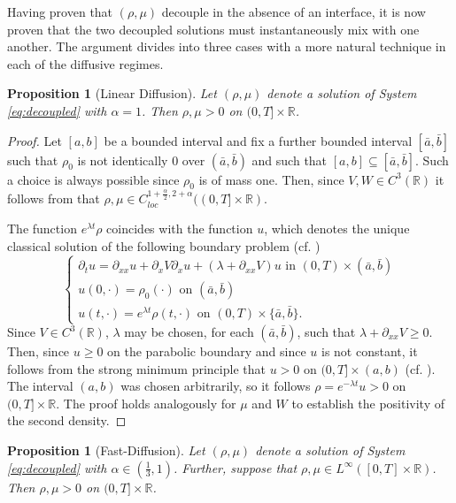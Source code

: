 \documentclass[a4paper,twosided, 11pt]{article}
\newcommand{\R}{\mathbb{R}}
\theoremstyle{plain}
\newtheorem{proposition}[thm]{Proposition}
\theoremstyle{remark}
\numberwithin{equation}{section}
\begin{document}
Having proven that $(\rho,\mu)$ decouple in the absence of an interface, it is now proven that the two decoupled solutions must instantaneously mix with one another. 
The argument divides into three cases with a more natural technique in each of the diffusive regimes.
\begin{proposition}[Linear Diffusion]\label{propn:linear}
    Let $(\rho,\mu)$ denote a solution of System \eqref{eq:decoupled} with $\alpha =1$. 
    Then $\rho,\mu > 0$ on $(0,T]\times \R$.
\end{proposition}
\begin{proof}
    Let $[a,b]$ be a bounded interval and fix a further bounded interval $[\bar{a},\bar{b}]$ such that $\rho_0$ is not identically 0 over $(\bar{a},\bar{b})$ and such that $[a,b] \subseteq [\bar{a},\bar{b}]$.
    Such a choice is always possible since $\rho_0$ is of mass one.
    Then, since $V,W \in C^3(\R)$ it follows from \cite[Theorem 5.2]{Ladyzhenskaya68} that $\rho, \mu \in C^{1+\frac{\alpha}{2},2+\alpha}_{loc}((0,T]\times \R)$.
    \medskip
    
  
    The function $e^{\lambda t}\rho$ coincides with the function $u$, which denotes the unique classical solution of the following boundary problem (cf. \cite[Theorem 5.3]{Ladyzhenskaya68})
    \begin{equation}
    \begin{cases}
      \partial_t u = \partial_{xx} u + \partial_x V\partial_x u + (\lambda + \partial_{xx}V)u  \text{ in }  (0,T)\times (\bar{a},\bar{b}) \\
      u(0,\cdot) = \rho_0(\cdot) \text{ on } (\bar{a},\bar{b}) \\ 
      u(t,\cdot) = e^{\lambda t} \rho(t,\cdot) \text{ on } (0,T) \times \{\bar{a},\bar{b}\}.
      \end{cases}
      \end{equation}
    Since $V \in C^3(\R)$, $\lambda$ may be chosen, for each $(\bar{a},\bar{b})$, such that $\lambda  + \partial_{xx}V \geqslant 0$. 
    Then, since $u \geqslant 0$ on the parabolic boundary and since $u$ is not constant, it follows from the strong minimum principle that $u > 0 $ on $(0,T] \times (a,b)$ (cf. \cite[Theorem 12, Chapter 7]{EvansPDE}).
    The interval $(a,b)$ was chosen arbitrarily, so it follows $\rho = e^{-\lambda t} u > 0$ on $(0,T] \times \R$. 
    The proof holds analogously for $\mu$ and $W$ to establish the positivity of the second density.
\end{proof}
\begin{proposition}[Fast-Diffusion]\label{propn:fast}
    Let $(\rho,\mu)$ denote a solution of System \eqref{eq:decoupled} with $\alpha \in (\frac{1}{3},1)$.
    Further, suppose that $\rho,\mu \in L^\infty([0,T]\times\R)$.
    Then $\rho,\mu > 0$ on $(0,T]\times \R$.
\end{proposition}
\end{document}
